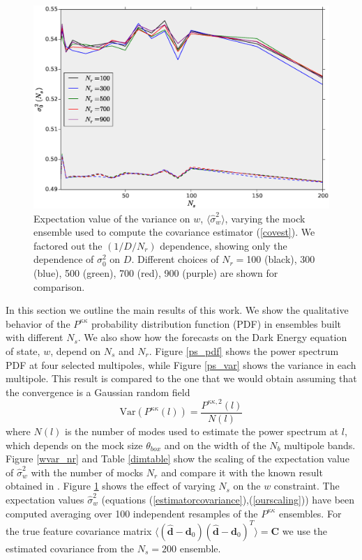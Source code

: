 \documentclass[reprint,aps,prd,superscriptaddress,showkeys,showpacs]{revtex4-1}
\newcommand{\bb}[1]{\mathbf{#1}}
\newcommand{\bbh}[1]{\mathbf{\hat{#1}}}
\newcommand{\h}[1]{\hat{#1}}
\begin{document}
\begin{figure}
\includegraphics[scale=0.3]{Figures/scaling_ns.eps}
\caption{Expectation value of the variance on $w$, $\langle\h{\sigma}^2_w\rangle$, varying the mock ensemble used to compute the covariance estimator (\ref{covest}). We factored out the $(1/D/N_r)$ dependence, showing only the dependence of $\sigma_0^2$ on $D$. Different choices of $N_r=$100 (black), 300 (blue), 500 (green), 700 (red), 900 (purple) are shown for comparison.}
\label{wvar_ns}
\end{figure}

In this section we outline the main results of this work. We show the qualitative behavior of the $P^{\kappa\kappa}$ probability distribution function (PDF) in ensembles built with different $N_s$. We also show how the forecasts on the Dark Energy equation of state, $w$, depend on $N_s$ and $N_r$. Figure \ref{ps_pdf} shows the power spectrum PDF at four selected multipoles, while Figure \ref{ps_var} shows the variance in each multipole. This result is compared to the one that we would obtain assuming that the convergence is a Gaussian random field
\begin{equation}
\label{gaussianvar}
\mathrm{Var}(P^{\kappa\kappa}(l)) = \frac{P^{\kappa\kappa,2}(l)}{N(l)}
\end{equation}
%
where $N(l)$ is the number of modes used to estimate the power spectrum at $l$, which depends on the mock size $\theta_{box}$ and on the width of the $N_b$ multipole bands. Figure \ref{wvar_nr} and Table \ref{dimtable} show the scaling of the expectation value of $\h{\sigma}_w^2$ with the number of mocks $N_r$ and compare it with the known result obtained in \citep{DodelsonSchneider13}. Figure \ref{wvar_ns} shows the effect of varying $N_s$ on the $w$ constraint. The expectation values $\h{\sigma}^2_w$ (equations (\ref{estimatorcovariance}),(\ref{ourscaling})) have been computed averaging over 100 independent resamples of the $P^{\kappa\kappa}$ ensembles. For the true feature covariance matrix $\langle(\bbh{d}-\bb{d}_0)(\bbh{d}-\bb{d}_0)^T\rangle=\bb{C}$ we use the estimated covariance from the $N_s=200$ ensemble. 
\end{document}
